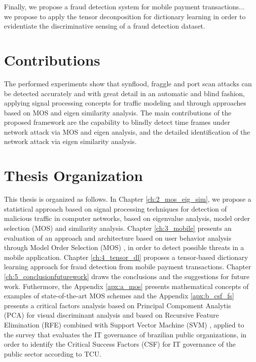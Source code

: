 Finally, we propose a fraud detection system for mobile payment transactions... we propose to apply the tensor deconposition for dictionary learning in order to evidentiate the discriminative sensing of a fraud detection dataset.


\section{Contributions}
\label{sc:contributions}

The performed experiments show that synflood, fraggle and port scan attacks can be detected accurately and with great detail in an automatic and blind fashion, applying signal processing concepts for traffic modeling and through approaches based on MOS and eigen similarity analysis. The main contributions of the proposed framework are the capability to blindly detect time frames under network attack via MOS and eigen analysis, and the detailed identification of the network attack via eigen similarity analysis.


\section{Thesis Organization}
\label{sc:organization}

This thesis is organized as follows. In Chapter \ref{ch:2_mos_eig_sim}, we propose a statistical approach based on signal processing techniques for detection of malicious traffic in computer networks, based on eigenvalue analysis, model order selection (MOS) and similarity analysis. Chapter \ref{ch:3_mobile} presents an evaluation of an approach and architecture based on user behavior analysis through Model Order Selection (MOS) \cite{tenorio2013greatest}, in order to detect possible threats in a mobile application. Chapter \ref{ch:4_tensor_dl} proposes a tensor-based dictionary learning approach for fraud detection from mobile payment transactions. Chapter \ref{ch:5_conclusionfuturework} draws the conclusions and the suggestions for future work. Futhermore, the Appendix \ref{apx:a_mos} presents mathematical concepts of examples of state-of-the-art MOS schemes and the Appendix \ref{apx:b_csf_fs} presents a critical factors analysis based on Principal Compoment Analytis (PCA) for visual discriminant analysis and based on Recursive Feature Elimination (RFE) combined with Support Vector Machine (SVM) \cite{hearst1998support}, applied to the survey that evaluates the IT governance of brazilian public organizations, in order to identify the Critical Success Factors (CSF) for IT governance of the public sector according to TCU.